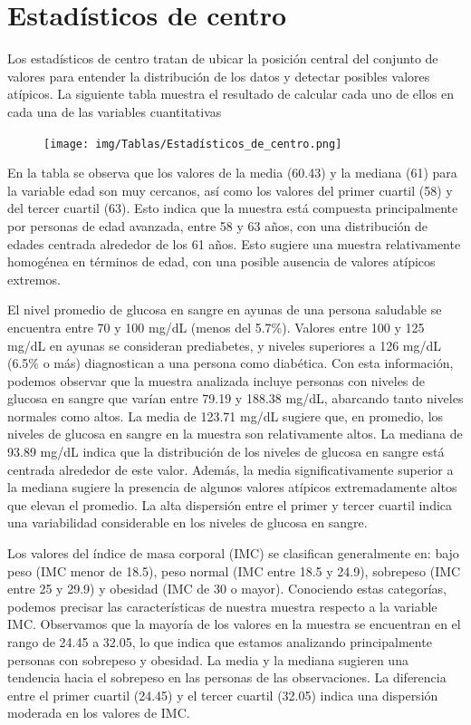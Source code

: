 \documentclass[a4paper, 12pt]{article}
\begin{document}
\newpage
\section{Estadísticos de centro}
Los estadísticos de centro tratan de ubicar la posición central del conjunto de valores
para entender la distribución de los datos y detectar posibles valores atípicos. La
siguiente tabla muestra el resultado de calcular cada uno de ellos en cada una de las
variables cuantitativas

\begin{figure}[h]
    \centering
    \texttt{[image: img/Tablas/Estadísticos\_de\_centro.png]}
\end{figure}

En la tabla se observa que los valores de la media (60.43) y la mediana (61) para la variable edad son muy cercanos, 
así como los valores del primer cuartil (58) y del tercer cuartil (63). Esto indica que la muestra está compuesta 
principalmente por personas de edad avanzada, entre 58 y 63 años, con una distribución de edades centrada alrededor 
de los 61 años. Esto sugiere una muestra relativamente homogénea en términos de edad, con una posible ausencia de 
valores atípicos extremos.

El nivel promedio de glucosa en sangre en ayunas de una persona saludable se encuentra entre 70 y 100 mg/dL 
(menos del 5.7\%). Valores entre 100 y 125 mg/dL en ayunas se consideran prediabetes, y niveles superiores a 126 mg/dL 
(6.5\% o más) diagnostican a una persona como diabética. Con esta información, podemos observar que la muestra analizada 
incluye personas con niveles de glucosa en sangre que varían entre 79.19 y 188.38 mg/dL, abarcando tanto niveles normales 
como altos. La media de 123.71 mg/dL sugiere que, en promedio, los niveles de glucosa en sangre en la muestra son 
relativamente altos. La mediana de 93.89 mg/dL indica que la distribución de los niveles de glucosa en sangre está centrada 
alrededor de este valor. Además, la media significativamente superior a la mediana sugiere la presencia de algunos valores 
atípicos extremadamente altos que elevan el promedio. La alta dispersión entre el primer y tercer cuartil indica una 
variabilidad considerable en los niveles de glucosa en sangre.

Los valores del índice de masa corporal (IMC) se clasifican generalmente en: bajo peso (IMC menor de 18.5), peso normal 
(IMC entre 18.5 y 24.9), sobrepeso (IMC entre 25 y 29.9) y obesidad (IMC de 30 o mayor). Conociendo estas categorías, 
podemos precisar las características de nuestra muestra respecto a la variable IMC. Observamos que la mayoría de los 
valores en la muestra se encuentran en el rango de 24.45 a 32.05, lo que indica que estamos analizando principalmente 
personas con sobrepeso y obesidad. La media y la mediana sugieren una tendencia hacia el sobrepeso en las personas 
de las observaciones. La diferencia entre el primer cuartil (24.45) y el tercer cuartil (32.05) indica una dispersión 
moderada en los valores de IMC.
\end{document}
